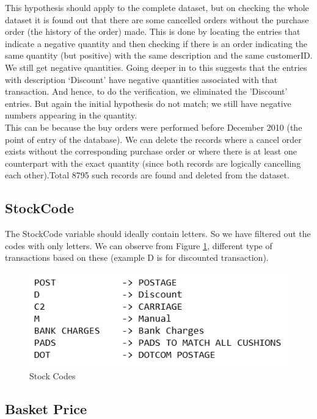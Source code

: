 This hypothesis should apply to the complete dataset, but on checking the whole dataset it is found out that there are some cancelled orders without the purchase order (the history of the order) made. This is done by locating the entries that indicate a negative quantity and then checking if there is an order indicating the same quantity (but positive) with the same description and the same customerID. We still get negative quantities. Going deeper in to this suggests that the entries with description `Discount' have negative quantities associated with that transaction. And hence, to do the verification, we eliminated the 'Discount' entries. But again the initial hypothesis do not match; we still have negative numbers appearing in the quantity.\\
This can be because the buy orders were performed before December 2010 (the point of entry of the database). We can delete the records where a cancel order exists without the corresponding purchase order or where there is at least one counterpart with the exact quantity (since both records are logically cancelling each other).Total 8795 such records are found and deleted from the dataset.\\

\subsection{StockCode}

The StockCode variable should ideally contain letters. So we have filtered out the codes with only letters. We can observe from Figure \ref{2.4}, different type of transactions based on these (example D is for discounted transaction).\\

\begin{figure}
\caption{Stock Codes}
\label{2.4}
\centering
\includegraphics[width=\columnwidth]{images/2_4.PNG}
\end{figure}

\subsection{Basket Price}

